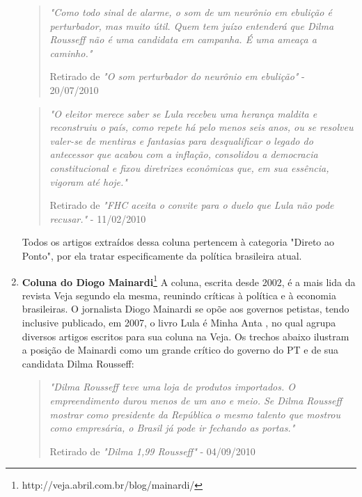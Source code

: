 \begin{enumerate}
\begin{quote}

\emph{"Como todo sinal de alarme, o som de um neurônio em ebulição é  perturbador, mas muito útil. Quem tem juízo entenderá que Dilma Rousseff não é uma candidata em campanha. É uma ameaça a caminho."}

{\small Retirado de \emph{"O som perturbador do neurônio em ebulição"} - 20/07/2010}

\end{quote}

\begin{quote}

\emph{"O eleitor merece saber se Lula recebeu uma herança maldita e reconstruiu o país, como repete há pelo menos seis anos, ou se resolveu valer-se de mentiras e fantasias para desqualificar o legado do antecessor que acabou com a inflação, consolidou a democracia constitucional e fixou diretrizes econômicas que, em sua essência, vigoram até hoje."}

{\small Retirado de \emph{"FHC aceita o convite para o duelo que Lula não pode recusar."} - 11/02/2010}
\end{quote}

Todos os artigos extraídos dessa coluna pertencem à categoria "Direto ao Ponto", por ela tratar especificamente da política brasileira atual.

\item \textbf{Coluna do Diogo Mainardi}\footnote{http://veja.abril.com.br/blog/mainardi/} A coluna, escrita desde 2002, é a mais lida da revista Veja segundo ela mesma, reunindo críticas à política e à economia brasileiras. O jornalista Diogo Mainardi se opõe aos governos petistas, tendo inclusive publicado, em 2007, o livro Lula é Minha Anta \cite{lula-anta}, no qual agrupa diversos artigos escritos para sua coluna na Veja. Os trechos abaixo ilustram a posição de Mainardi como um grande crítico do governo do PT e de sua candidata Dilma Rousseff:

\begin{quote}

\emph{"Dilma Rousseff teve uma loja de produtos importados. O empreendimento durou menos de um ano e meio. Se Dilma Rousseff mostrar como presidente da República o mesmo talento que mostrou como empresária, o Brasil já pode ir fechando as portas."}

{\small Retirado de \emph{"Dilma 1,99 Rousseff"} - 04/09/2010}
\end{quote}  


\end{enumerate}
